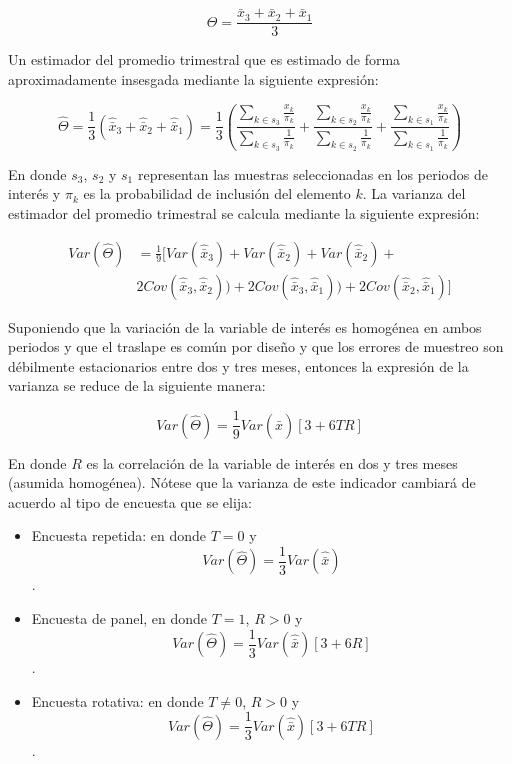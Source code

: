 \[
\Theta = \frac{\bar{x}_3 + \bar{x}_2 + \bar{x}_1}{3}
\]

Un estimador del promedio trimestral que es estimado de forma aproximadamente insesgada mediante la siguiente expresión:

\[
\hat{\Theta} = \frac{1}{3} \left( \hat{\bar{x}}_3 + \hat{\bar{x}}_2 + \hat{\bar{x}}_1 \right)
= \frac{1}{3}\left( \frac{\sum_{k\in s_3}\frac{x_{k}}{\pi_k}}{\sum_{k\in s_3}\frac{1}{\pi_k}} + \frac{\sum_{k\in s_2}\frac{x_{k}}{\pi_k}}{\sum_{k\in s_2}\frac{1}{\pi_k}} + \frac{\sum_{k\in s_1}\frac{x_{k}}{\pi_k}}{\sum_{k\in s_1}\frac{1}{\pi_k}} \right)
\]

En donde \(s_3\), \(s_2\) y \(s_1\) representan las muestras seleccionadas en los periodos de interés y \(\pi_k\) es la probabilidad de inclusión del elemento \(k\). La varianza del estimador del promedio trimestral se calcula mediante la siguiente expresión:

\[
\begin{split}
Var(\hat{\Theta}) & = \frac{1}{9}[Var(\hat{\bar{x}}_3) + Var(\hat{\bar{x}}_2) + Var(\hat{\bar{x}}_2) + \\ 
&2Cov(\hat{\bar{x}}_3, \hat{\bar{x}}_2)) + 2Cov(\hat{\bar{x}}_3, \hat{\bar{x}}_1)) + 2Cov(\hat{\bar{x}}_2, \hat{\bar{x}}_1)]
\end{split}
\]

Suponiendo que la variación de la variable de interés es homogénea en ambos periodos y que el traslape es común por diseño y que los errores de muestreo son débilmente estacionarios entre dos y tres meses, entonces la expresión de la varianza se reduce de la siguiente manera:

\[
Var(\hat{\Theta}) = \frac{1}{9} Var(\hat{\bar{x}})[3 + 6TR]
\]

En donde \(R\) es la correlación de la variable de interés en dos y tres meses (asumida homogénea). Nótese que la varianza de este indicador cambiará de acuerdo al tipo de encuesta que se elija:

\begin{itemize}
\tightlist
\item
  Encuesta repetida: en donde \(T=0\) y
  \[Var(\hat{\Theta}) = \frac{1}{3} Var(\hat{\bar{x}})\].
\item
  Encuesta de panel, en donde \(T=1\), \(R > 0\) y
  \[Var(\hat{\Theta}) = \frac{1}{3} Var(\hat{\bar{x}}) [3+6R]\].
\item
  Encuesta rotativa: en donde \(T\neq 0\), \(R > 0\) y
  \[Var(\hat{\Theta}) = \frac{1}{3} Var(\hat{\bar{x}}) [3+6TR]\].
\end{itemize}

